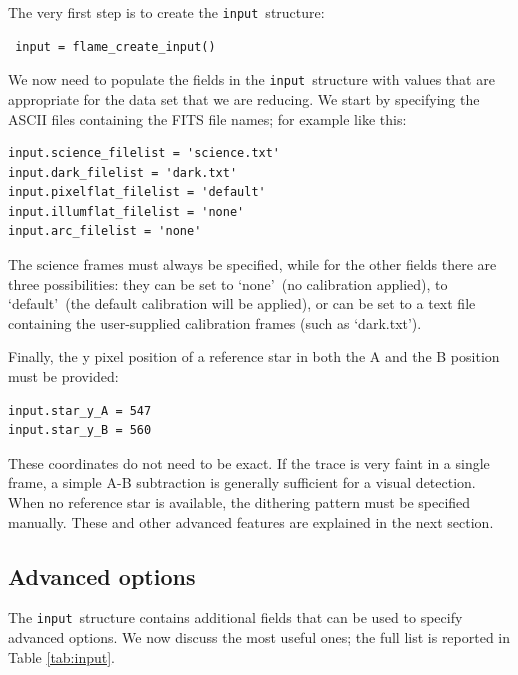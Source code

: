 \documentclass[a4paper, notitlepage]{article}
\newcommand{\inp}{\texttt{input}}
\begin{document}
The very first step is to create the \inp\ structure:
\begin{lstlisting}
 input = flame_create_input()
\end{lstlisting}
We now need to populate the fields in the \inp\ structure with values that are appropriate for the data set that we are reducing.
We start by specifying the ASCII files containing the FITS file names; for example like this:
\begin{lstlisting}
input.science_filelist = 'science.txt'
input.dark_filelist = 'dark.txt'
input.pixelflat_filelist = 'default'
input.illumflat_filelist = 'none'
input.arc_filelist = 'none'
\end{lstlisting}
The science frames must always be specified, while for the other fields there are three possibilities: they can be set to \textquoteleft none\textquoteright\ (no calibration applied), to \textquoteleft default\textquoteright\ (the default calibration will be applied), or can be set to a text file containing the user-supplied calibration frames (such as \textquoteleft dark.txt\textquoteright).

Finally, the y pixel position of a reference star in both the A and the B position must be provided:
\begin{lstlisting}
input.star_y_A = 547
input.star_y_B = 560
\end{lstlisting}
These coordinates do not need to be exact. If the trace is very faint in a single frame, a simple A-B subtraction is generally sufficient for a visual detection. When no reference star is available, the dithering pattern must be specified manually. These and other advanced features are explained in the next section.


\subsection{Advanced options}

The \inp\ structure contains additional fields that can be used to specify advanced options. We now discuss the most useful ones; the full list is reported in Table \ref{tab:input}.
\end{document}
